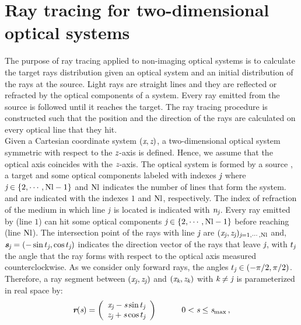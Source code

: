 \section{Ray tracing for two-dimensional optical systems}\label{sec:raytracing}
The purpose of ray tracing applied to non-imaging optical systems is to calculate the target rays distribution given an optical system and an initial distribution of the rays at the source.
Light rays are straight lines and they are reflected or refracted by the optical components of a system.
Every ray emitted from the source is followed until it reaches the target.  
The ray tracing procedure is constructed such that the position and the direction of the rays are calculated on every optical line that they hit. \\ \indent
Given a Cartesian coordinate system $(\textit{x}, \textit{z})$, a two-dimensional optical system symmetric with respect to the $\textit{z}$-axis is defined.
Hence, we assume that the optical axis coincides with the $\textit{z}$-axis.
The optical system is formed by a source , a target   and some optical components labeled with indexes $\textit{j}$ where $\textit{j} \in \{2, \cdots, \textrm{Nl}-1\}$ and $\textrm{Nl}$
 indicates the number of lines that form the system.  and  are indicated with the indexes $1$ and $\textrm{Nl}$, respectively.
The index of refraction of the medium in which line $\textit{j}$ is located is indicated with $\textit{n}_{\textit{j}}$.
Every ray emitted by  (line $1$) can hit some optical components $\textit{j}\in\{2, \cdots, \textrm{Nl} -1\}$ before reaching  (line $\textrm{Nl}$).
The intersection point of the rays with line $\textit{j}$ are $(\textit{x}_{\textit{j}}, \textit{z}_{\textit{j}})_{\textit{j} =1, \cdots, \textrm{Nl}}$ and, $\textit{\textbf{s}}_{\textit{j}}= (-\sin t_{\textit{j}}, \cos t_{\textit{j}})$ indicates the direction vector of the rays that leave $\textit{j}$,
with $t_{\textit{j}}$ the angle that the ray forms with respect to the optical axis measured counterclockwise. As we consider only forward rays, the angles
$t_{\textit{j}}\in (-\pi/2, \pi/2)$.
Therefore, a ray segment between $(\textit{x}_{\textit{j}}, \textit{z}_{\textit{j}})$ and $(\textit{x}_{\textit{k}}, \textit{z}_{\textit{k}})$
with $\textit{k}\neq\textit{j}$ is parameterized in real space by:
\begin{equation}
\label{parametrization}
\textit{\textbf{r}}(\textit{s})=
\left( \begin{array}{cc}
\textit{x}_{\textit{j}}-\textit{s}\sin t_{\textit{j}} \\
\textit{z}_{\textit{j}}+\textit{s}\cos t_{\textit{j}}\end{array} \right) \qquad \quad 0< \textit{s}\leq \textit{s}_{\textrm{max}}\,,
\end{equation}
